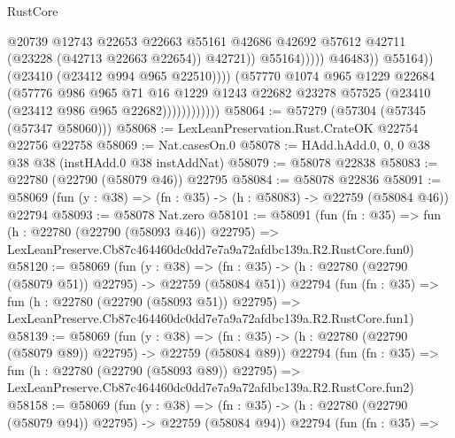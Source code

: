 \begin{lexlean}{RustCore}
\begin{coremodule}
                                              @20739
                                              @12743
                                              @22653
                                              @22663
                                              @55161
                                              @42686
                                              @42692
                                              @57612
                                              @42711
                                              (@23228 (@42713 @22663 @22654))
                                              @42721))
                                          @55164)))))
                                @46483))
                            @55164))
                        (@23410 (@23412 @994 @965 @22510))))
                    (@57770
                      @1074
                      @965
                      @1229
                      @22684
                      (@57776
                        @986
                        @965
                        @71
                        @16
                        @1229
                        @1243
                        @22682
                        @23278
                        @57525
                        (@23410 (@23412 @986 @965 @22682))))))))))))
@58064 := @57279 (@57304 (@57345 (@57347 @58060)))
@58068 := LexLeanPreservation.Rust.CrateOK @22754 @22756 @22758
@58069 := Nat.casesOn.{0}
@58078 := HAdd.hAdd.{0, 0, 0} @38 @38 @38 (instHAdd.{0} @38 instAddNat)
@58079 := @58078 @22838
@58083 := @22780 (@22790 (@58079 @46)) @22795
@58084 := @58078 @22836
@58091 := @58069 (fun (y : @38) => (fn : @35) -> (h : @58083) -> @22759 (@58084 @46)) @22794
@58093 := @58078 Nat.zero
@58101 := @58091
    (fun (fn : @35) =>
    fun (h : @22780 (@22790 (@58093 @46)) @22795) =>
    LexLeanPreserve.Cb87c464460dc0dd7e7a9a72afdbc139a.R2.RustCore.fun0)
@58120 := @58069
    (fun (y : @38) =>
    (fn : @35) -> (h : @22780 (@22790 (@58079 @51)) @22795) -> @22759 (@58084 @51))
    @22794
    (fun (fn : @35) =>
    fun (h : @22780 (@22790 (@58093 @51)) @22795) =>
    LexLeanPreserve.Cb87c464460dc0dd7e7a9a72afdbc139a.R2.RustCore.fun1)
@58139 := @58069
    (fun (y : @38) =>
    (fn : @35) -> (h : @22780 (@22790 (@58079 @89)) @22795) -> @22759 (@58084 @89))
    @22794
    (fun (fn : @35) =>
    fun (h : @22780 (@22790 (@58093 @89)) @22795) =>
    LexLeanPreserve.Cb87c464460dc0dd7e7a9a72afdbc139a.R2.RustCore.fun2)
@58158 := @58069
    (fun (y : @38) =>
    (fn : @35) -> (h : @22780 (@22790 (@58079 @94)) @22795) -> @22759 (@58084 @94))
    @22794
    (fun (fn : @35) =>

\end{coremodule}
\end{lexlean}
